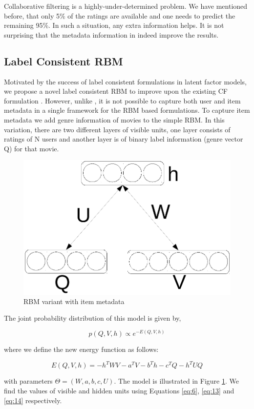 \documentclass[conference]{IEEEtran}
\begin{document}
Collaborative filtering is a highly-under-determined problem. We have mentioned before, that only 5\% of the ratings are available and one needs to predict the remaining 95\%. In such a situation, any extra information helps. It is not surprising that the metadata information in \cite{gogna2016supervised} indeed improve the results. 

    \subsection{Label Consistent RBM}

  Motivated by the success of label consistent formulations in latent factor models, we propose a novel label consistent RBM to improve upon the existing CF formulation \cite{Salakhutdinov}. However, unlike \cite{gogna2016supervised}, it is not possible to capture both user and item metadata in a single framework for the RBM based formulations. To capture item metadata we add genre information of movies to the simple RBM. In this variation, there are two different layers of visible units, one layer consists of ratings of N users and another layer is of binary label information (genre vector Q) for that movie.

    \begin{figure}
      \centering
      \includegraphics[width=0.3\linewidth]{rbm3}
      \caption{RBM variant with item metadata}
      \label{fig:4}
    \end{figure}

    The joint probability distribution of this model is given by,

    \begin{equation}
      p(Q,V,h) \propto e^{-E(Q,V,h)}
      \label{eq:11}
    \end{equation}

    where we define the new energy function as follows:

    \begin{equation}
      E(Q,V,h) = -h^TWV - a^TV -b^Th - c^TQ - h^TUQ
      \label{eq:12}
    \end{equation}

    with parameters $\Theta = (W,a,b,c,U)$. The model is illustrated in Figure \ref{fig:4}. We find the values of visible and hidden units using Equations \ref{eq:6}, \ref{eq:13} and \ref{eq:14} respectively.
\end{document}
